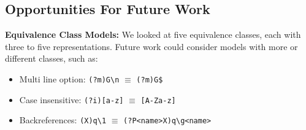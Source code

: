 %
%

\subsection{Opportunities For Future Work}
\label{sec:futureequivclasses}
%
\noindent \textbf{Equivalence Class Models:}
We looked at five equivalence classes, each with three to five representations. 
Future work could consider models with more or different classes, such as: 
%
\begin{itemize} %
\item Multi line option: { \verb!(?m)G\n! $\equiv$ \verb!(?m)G$!}
\item Case insensitive:{ \verb!(?i)[a-z]! $\equiv$ \verb![A-Za-z]!}
\item Backreferences: {\verb!(X)q\1! $\equiv$ \verb!(?P<name>X)q\g<name>!}
\end{itemize}



